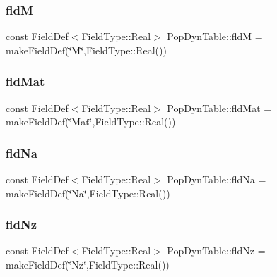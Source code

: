 \mbox{\label{class_pop_dyn_table_a74145c3391e6498542d468bf063c3d01}} 
\subsubsection{\texorpdfstring{fldM}{fldM}}
{\footnotesize\ttfamily const Field\+Def$<$Field\+Type\+::\+Real$>$ Pop\+Dyn\+Table\+::fldM = make\+Field\+Def(\char`\"{}M\char`\"{},Field\+Type\+::\+Real())}

\mbox{\label{class_pop_dyn_table_aa2b80bf86f409ef0f59a606948ed04e9}} 
\subsubsection{\texorpdfstring{fldMat}{fldMat}}
{\footnotesize\ttfamily const Field\+Def$<$Field\+Type\+::\+Real$>$ Pop\+Dyn\+Table\+::fld\+Mat = make\+Field\+Def(\char`\"{}Mat\char`\"{},Field\+Type\+::\+Real())}

\mbox{\label{class_pop_dyn_table_ab25ca20a0efce5852a7163e55c3fbcf1}} 
\subsubsection{\texorpdfstring{fldNa}{fldNa}}
{\footnotesize\ttfamily const Field\+Def$<$Field\+Type\+::\+Real$>$ Pop\+Dyn\+Table\+::fld\+Na = make\+Field\+Def(\char`\"{}Na\char`\"{},Field\+Type\+::\+Real())}

\mbox{\label{class_pop_dyn_table_aab077b5a51bb261726bf9c76417169d4}} 
\subsubsection{\texorpdfstring{fldNz}{fldNz}}
{\footnotesize\ttfamily const Field\+Def$<$Field\+Type\+::\+Real$>$ Pop\+Dyn\+Table\+::fld\+Nz = make\+Field\+Def(\char`\"{}Nz\char`\"{},Field\+Type\+::\+Real())}

\mbox{\label{class_pop_dyn_table_ad51d99b3177df980d855e64ec2b41929}} 
